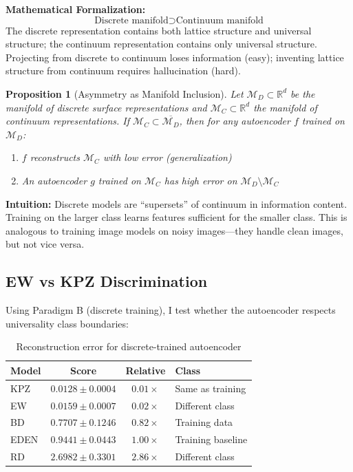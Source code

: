 \documentclass[aps,pre,reprint,amsmath,amssymb,superscriptaddress]{revtex4-2}
\newtheorem{proposition}{Proposition}
\newcommand{\bbR}{\mathbb{R}}
\begin{document}
\textbf{Mathematical Formalization:}
\begin{equation}
\text{Discrete manifold} \supset \text{Continuum manifold}
\end{equation}
The discrete representation contains both lattice structure and universal structure; the continuum representation contains only universal structure. Projecting from discrete to continuum loses information (easy); inventing lattice structure from continuum requires hallucination (hard).

\begin{proposition}[Asymmetry as Manifold Inclusion]
\label{prop:asymmetry}
Let $\mathcal{M}_D \subset \bbR^d$ be the manifold of discrete surface representations and $\mathcal{M}_C \subset \bbR^d$ the manifold of continuum representations. If $\mathcal{M}_C \subset \overline{\mathcal{M}_D}$, then for any autoencoder $f$ trained on $\mathcal{M}_D$:
\begin{enumerate}
\item $f$ reconstructs $\mathcal{M}_C$ with low error (generalization)
\item An autoencoder $g$ trained on $\mathcal{M}_C$ has high error on $\mathcal{M}_D \setminus \mathcal{M}_C$
\end{enumerate}
\end{proposition}

\textbf{Intuition:} Discrete models are ``supersets'' of continuum in information content. Training on the larger class learns features sufficient for the smaller class. This is analogous to training image models on noisy images---they handle clean images, but not vice versa.

\subsection{EW vs KPZ Discrimination}
\label{sec:ew-kpz-discrimination}

Using Paradigm B (discrete training), I test whether the autoencoder respects universality class boundaries:

\begin{table}[h]
\centering
\caption{Reconstruction error for discrete-trained autoencoder}
\label{tab:ew-kpz}
\begin{tabular}{lccl}
\toprule
Model & Score & Relative & Class \\
\midrule
KPZ & $0.0128 \pm 0.0004$ & $0.01\times$ & Same as training \\
EW & $0.0159 \pm 0.0007$ & $0.02\times$ & Different class \\
BD & $0.7707 \pm 0.1246$ & $0.82\times$ & Training data \\
EDEN & $0.9441 \pm 0.0443$ & $1.00\times$ & Training baseline \\
RD & $2.6982 \pm 0.3301$ & $2.86\times$ & Different class \\
\bottomrule
\end{tabular}
\end{table}
\end{document}
